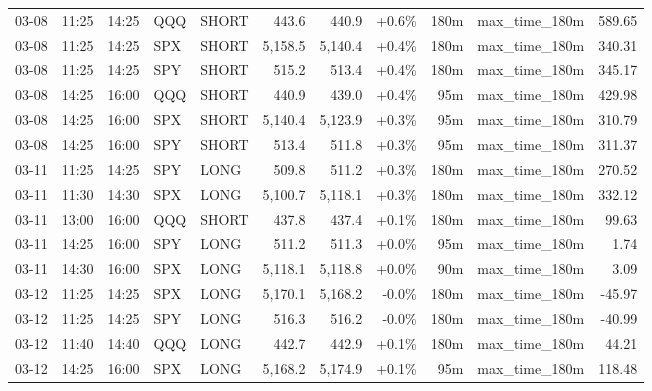 \documentclass[11pt,a4paper,twoside]{article}
\begin{document}
\begin{center}
\begin{longtable}{>{\color{txtmain}}l l l l l r r r r >{\color{txtmain}}l r}
03-08 & 11:25 & 14:25 & QQQ & SHORT & 443.6 & 440.9 & \textcolor{wingreen}{+0.6\%} & 180m & max\_time\_180m & \textcolor{wingreen}{589.65} \\
03-08 & 11:25 & 14:25 & SPX & SHORT & 5,158.5 & 5,140.4 & \textcolor{wingreen}{+0.4\%} & 180m & max\_time\_180m & \textcolor{wingreen}{340.31} \\
03-08 & 11:25 & 14:25 & SPY & SHORT & 515.2 & 513.4 & \textcolor{wingreen}{+0.4\%} & 180m & max\_time\_180m & \textcolor{wingreen}{345.17} \\
03-08 & 14:25 & 16:00 & QQQ & SHORT & 440.9 & 439.0 & \textcolor{wingreen}{+0.4\%} & 95m & max\_time\_180m & \textcolor{wingreen}{429.98} \\
03-08 & 14:25 & 16:00 & SPX & SHORT & 5,140.4 & 5,123.9 & \textcolor{wingreen}{+0.3\%} & 95m & max\_time\_180m & \textcolor{wingreen}{310.79} \\
03-08 & 14:25 & 16:00 & SPY & SHORT & 513.4 & 511.8 & \textcolor{wingreen}{+0.3\%} & 95m & max\_time\_180m & \textcolor{wingreen}{311.37} \\
03-11 & 11:25 & 14:25 & SPY & LONG & 509.8 & 511.2 & \textcolor{wingreen}{+0.3\%} & 180m & max\_time\_180m & \textcolor{wingreen}{270.52} \\
03-11 & 11:30 & 14:30 & SPX & LONG & 5,100.7 & 5,118.1 & \textcolor{wingreen}{+0.3\%} & 180m & max\_time\_180m & \textcolor{wingreen}{332.12} \\
03-11 & 13:00 & 16:00 & QQQ & SHORT & 437.8 & 437.4 & \textcolor{wingreen}{+0.1\%} & 180m & max\_time\_180m & \textcolor{wingreen}{99.63} \\
03-11 & 14:25 & 16:00 & SPY & LONG & 511.2 & 511.3 & \textcolor{wingreen}{+0.0\%} & 95m & max\_time\_180m & \textcolor{wingreen}{1.74} \\
03-11 & 14:30 & 16:00 & SPX & LONG & 5,118.1 & 5,118.8 & \textcolor{wingreen}{+0.0\%} & 90m & max\_time\_180m & \textcolor{wingreen}{3.09} \\
03-12 & 11:25 & 14:25 & SPX & LONG & 5,170.1 & 5,168.2 & \textcolor{lossred}{-0.0\%} & 180m & max\_time\_180m & \textcolor{lossred}{-45.97} \\
03-12 & 11:25 & 14:25 & SPY & LONG & 516.3 & 516.2 & \textcolor{lossred}{-0.0\%} & 180m & max\_time\_180m & \textcolor{lossred}{-40.99} \\
03-12 & 11:40 & 14:40 & QQQ & LONG & 442.7 & 442.9 & \textcolor{wingreen}{+0.1\%} & 180m & max\_time\_180m & \textcolor{wingreen}{44.21} \\
03-12 & 14:25 & 16:00 & SPX & LONG & 5,168.2 & 5,174.9 & \textcolor{wingreen}{+0.1\%} & 95m & max\_time\_180m & \textcolor{wingreen}{118.48} \\

\end{longtable}
\end{center}
\end{document}

